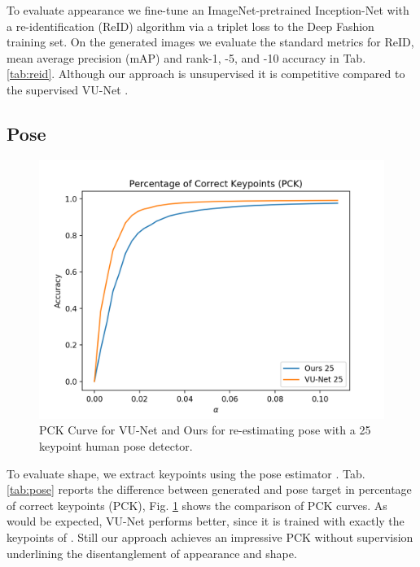 	To evaluate appearance we fine-tune an ImageNet-pretrained \cite{russakovsky15imagenet} Inception-Net \cite{szegedy15inception} with a re-identification (ReID) algorithm \cite{xiao17reidjoint} via a triplet loss \cite{hermans17reidtriplet} to the Deep Fashion training set.
	On the generated images we evaluate the standard metrics for ReID, mean average precision (mAP) and rank-1, -5, and -10 accuracy in Tab. \ref{tab:reid}.
	Although our approach is unsupervised it is competitive compared to the supervised VU-Net \cite{esser18}.


	\subsection{Pose}
	\begin{figure}[htp]
		\centering
		\includegraphics[trim={0cm 0cm 0cm 0cm},clip, width=1.0\linewidth]{fig/factor/pck25}
		\caption{PCK Curve for VU-Net \cite{esser18} and Ours for re-estimating pose with a 25 keypoint human pose detector.}
		\label{fig:pckcurve}
	\end{figure}

	To evaluate shape, we extract keypoints using the pose estimator \cite{cao17affinityfield}. Tab. \ref{tab:pose} reports the difference between generated and pose target in percentage of correct keypoints (PCK), Fig. \ref{fig:pckcurve} shows the comparison of PCK curves. As would be expected, VU-Net performs better, since it is trained with exactly the keypoints of \cite{cao17affinityfield}. Still our approach achieves an impressive PCK without supervision underlining the disentanglement of appearance and shape.


